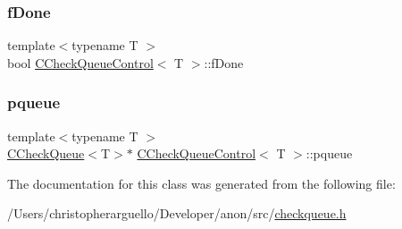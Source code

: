 \subsubsection{\texorpdfstring{f\+Done}{fDone}}
{\footnotesize\ttfamily template$<$typename T $>$ \\
bool \mbox{\hyperlink{class_c_check_queue_control}{C\+Check\+Queue\+Control}}$<$ T $>$\+::f\+Done\hspace{0.3cm}{\ttfamily [private]}}

\mbox{\label{class_c_check_queue_control_a5ac89e097f74678003bbc66f412dbe70}} 
\subsubsection{\texorpdfstring{pqueue}{pqueue}}
{\footnotesize\ttfamily template$<$typename T $>$ \\
\mbox{\hyperlink{class_c_check_queue}{C\+Check\+Queue}}$<$T$>$$\ast$ \mbox{\hyperlink{class_c_check_queue_control}{C\+Check\+Queue\+Control}}$<$ T $>$\+::pqueue\hspace{0.3cm}{\ttfamily [private]}}



The documentation for this class was generated from the following file\+:\begin{DoxyCompactItemize}
\item 
/\+Users/christopherarguello/\+Developer/anon/src/\mbox{\hyperlink{checkqueue_8h}{checkqueue.\+h}}\end{DoxyCompactItemize}
